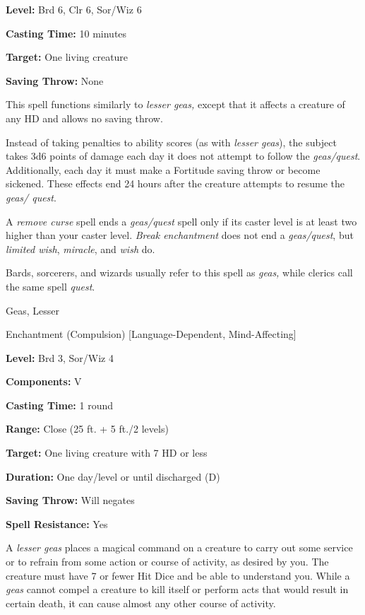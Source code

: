 \documentclass{article}
\begin{document}
\textbf{Level:} Brd 6, Clr 6, Sor/Wiz 6

\textbf{Casting Time:} 10 minutes

\textbf{Target:} One living creature

\textbf{Saving Throw:} None

This spell functions similarly to \textit{lesser geas, }except that it affects 
a creature of any HD and allows no saving throw.

Instead of taking penalties to ability scores (as with \textit{lesser geas}), the 
subject takes 3d6 points of damage each day it does not attempt to follow the \textit{geas/quest}. 
Additionally, each day it must make a Fortitude saving throw or become sickened. 
These effects end 24 hours after the creature attempts to resume the \textit{geas/ 
quest}.

A \textit{remove curse }spell ends a \textit{geas/quest }spell only if its caster 
level is at least two higher than your caster level. \textit{Break enchantment 
}does not end a \textit{geas/quest}, but \textit{limited wish}, \textit{miracle}, 
and \textit{wish }do.

Bards, sorcerers, and wizards usually refer to this spell as \textit{geas, }while 
clerics call the same spell \textit{quest}.

\vspace{12pt}
Geas, Lesser

Enchantment (Compulsion) [Language-Dependent, Mind-Affecting]

\textbf{Level:} Brd 3, Sor/Wiz 4

\textbf{Components:} V

\textbf{Casting Time:} 1 round

\textbf{Range:} Close (25 ft. + 5 ft./2 levels)

\textbf{Target:} One living creature with 7 HD or less

\textbf{Duration:} One day/level or until discharged (D)

\textbf{Saving Throw: }Will negates

\textbf{Spell Resistance:} Yes

A \textit{lesser geas }places a magical command on a creature to carry out some 
service or to refrain from some action or course of activity, as desired by you. 
The creature must have 7 or fewer Hit Dice and be able to understand you. While 
a \textit{geas }cannot compel a creature to kill itself or perform acts that would 
result in certain death, it can cause almost any other course of activity.
\end{document}
